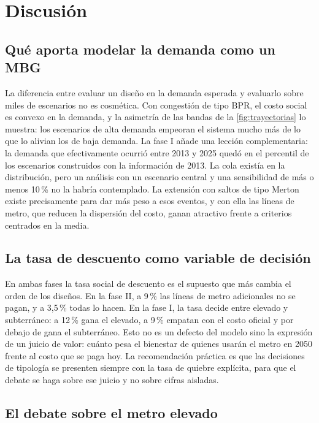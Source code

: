 \chapter{Discusión}\label{cap:discusion}

\section{Qué aporta modelar la demanda como un MBG}

La diferencia entre evaluar un diseño en la demanda esperada y evaluarlo sobre miles de escenarios no es
cosmética. Con congestión de tipo BPR, el costo social es convexo en la demanda, y la asimetría de las
bandas de la \cref{fig:trayectorias} lo muestra: los escenarios de alta demanda empeoran el sistema
mucho más de lo que lo alivian los de baja demanda. La fase I añade una lección complementaria: la
demanda que efectivamente ocurrió entre 2013 y 2025 quedó en el percentil \PercentilObsFin{} de los
escenarios construidos con la información de 2013. La cola existía en la distribución, pero un
análisis con un escenario central y una sensibilidad de más o menos 10\,\% no la habría contemplado.
La extensión con saltos de tipo Merton existe precisamente para dar más peso a esos eventos, y con
ella las líneas de metro, que reducen la dispersión del costo, ganan atractivo frente a criterios
centrados en la media.

\section{La tasa de descuento como variable de decisión}

En ambas fases la tasa social de descuento es el supuesto que más cambia el orden de los diseños. En la
fase II, a 9\,\% las líneas de metro adicionales no se pagan, y a 3,5\,\% todas lo hacen. En la fase I,
la tasa decide entre elevado y subterráneo: a 12\,\% gana el elevado, a 9\,\% empatan con el costo
oficial y por debajo de \TasaEmpate{} gana el subterráneo. Esto no es un defecto del modelo sino la
expresión de un juicio de valor: cuánto pesa el bienestar de quienes usarán el metro en 2050 frente al
costo que se paga hoy. La recomendación práctica es que las decisiones de tipología se presenten
siempre con la tasa de quiebre explícita, para que el debate se haga sobre ese juicio y no sobre cifras
aisladas.

\section{El debate sobre el metro elevado}

